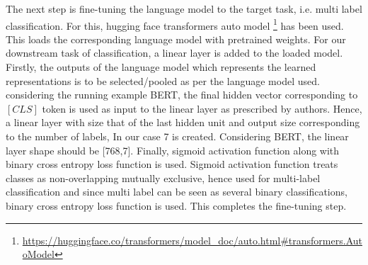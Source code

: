 The next step is fine-tuning the language model to the target task, i.e. multi label classification. For this, hugging face transformers auto model \footnote{\url{https://huggingface.co/transformers/model_doc/auto.html#transformers.AutoModel}} has been used. This loads the corresponding language model with pretrained weights. For our downstream task of classification, a linear layer is added to the loaded model. Firstly, the outputs of the language model which represents the learned representations is to be selected/pooled as per the language model used. considering the running example BERT, the final hidden vector corresponding to $[CLS]$ token is used as input to the linear layer as prescribed by authors\cite{devlin2018bert}. Hence, a linear layer with size that of the last hidden unit and output size corresponding to the number of labels, In our case 7 is created. Considering BERT, the linear layer shape should be [768,7].  Finally, sigmoid activation function along with binary cross entropy loss function is used. Sigmoid activation function treats classes as non-overlapping mutually exclusive, hence used for multi-label classification and since multi label can be seen as several binary classifications, binary cross entropy loss function is used. This completes the fine-tuning step.

